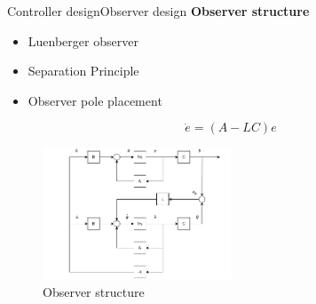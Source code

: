 
\begin{frame}{Controller design}{Observer design}
	\textbf{Observer structure}
	\begin{itemize}
		\item Luenberger observer
		\item Separation Principle
		\item Observer pole placement
	\end{itemize}


\begin{equation} \label{eq:obs_error_dot}
	\dot{e} = (A - LC)e
\end{equation}
\begin{figure}[h!]
	\centering
	\includegraphics[width=0.5\textwidth]{../Graphics/Observer_diagram.pdf}
	\caption{Observer structure}
	\label{fig:obs_struct}
\end{figure}
\end{frame}




